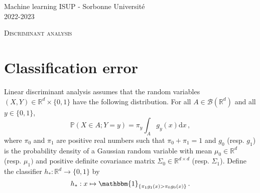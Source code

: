 \documentclass[a4paper,10pt,fleqn]{article}
\newcommand{\eqsp}{\,}
\newcommand{\rmd}{\mathrm{d}}
\newcommand{\rset}{\ensuremath{\mathbb{R}}}
\newcommand{\bP}{\mathbb{P}}
\newcommand{\1}{\ensuremath{\mathbbm{1}}}
\begin{document}
\noindent Machine learning \hfill ISUP - Sorbonne Universit\'e \\
 2022-2023

\noindent\hrulefill

\begin{center}
\textsc{Discriminant analysis}
\end{center}
\hrulefill

\section{Classification error}
Linear discriminant analysis assumes that the random variables $(X,Y)\in \rset^d\times\{0,1\}$ have the following distribution. For all $A\in \mathcal{B}(\mathbb{R}^d)$ and all $y\in\{0,1\}$,
\[
\bP\left(X\in A;Y=y\right) = \pi_y \int_A g_y(x) \rmd x\eqsp,
\]
where $\pi_{0}$ and $\pi_1$ are positive real numbers such that $\pi_0+\pi_{1}=1$ and $g_0$ (resp. $g_1$) is the probability density of a Gaussian random variable with mean $\mu_0\in\rset^d$ (resp. $\mu_1)$ and positive definite covariance matrix $\Sigma_0\in \rset^{d\times d}$ (resp. $\Sigma_1$).  Define the classifier $h_{*}:\mathbb{R}^d\to\{0,1\}$ by
$$
h_{*}:x \mapsto \1_{\{\pi_{1}g_{1}(x)>\pi_{0}g_{0}(x)\}}\eqsp.
$$
\end{document}
